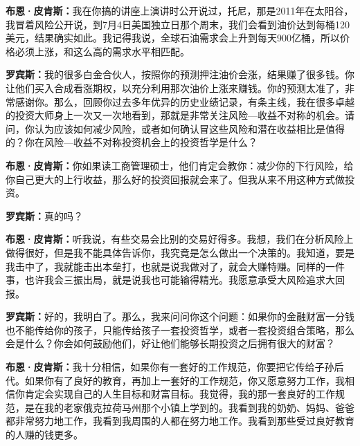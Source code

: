 \begin{BookQuote}
\textbf{布恩·皮肯斯：}我在你搞的讲座上演讲时公开说过，托尼，那是2011年在太阳谷，我冒着风险公开说，到7月4日美国独立日那个周末，我们会看到油价达到每桶120美元，结果确实如此。我记得我说，全球石油需求会上升到每天900亿桶，所以价格必须上涨，和这么高的需求水平相匹配。
\end{BookQuote}

\begin{BookQuote}
\textbf{罗宾斯：}我的很多白金合伙人，按照你的预测押注油价会涨，结果赚了很多钱。你让他们买入合成看涨期权，以充分利用那次油价上涨来赚钱。你的预测太准了，非常感谢你。那么，回顾你过去多年优异的历史业绩记录，有条主线，我在很多卓越的投资大师身上一次又一次地看到，那就是非常关注风险—收益不对称的机会。请问，你认为应该如何减少风险，或者如何确认冒这些风险和潜在收益相比是值得的？你在风险—收益不对称投资机会上的投资哲学是什么？
\end{BookQuote}

\begin{BookQuote}
\textbf{布恩·皮肯斯：}你如果读工商管理硕士，他们肯定会教你：减少你的下行风险，给你自己更大的上行收益，那么好的投资回报就会来了。但我从来不用这种方式做投资。
\end{BookQuote}

\begin{BookQuote}
\textbf{罗宾斯：}真的吗？
\end{BookQuote}

\begin{BookQuote}
\textbf{布恩·皮肯斯：}听我说，有些交易会比别的交易好得多。我想，我们在分析风险上做得很好，但是我不能具体告诉你，我究竟是怎么做出一个决策的。我知道，要是我击中了，我就能击出本垒打，也就是说我做对了，就会大赚特赚。同样的一件事，也许我会三振出局，就是说我也可能输得精光。我愿意承受大风险追求大回报。
\end{BookQuote}

\begin{BookQuote}
\textbf{罗宾斯：}好的，我明白了。那么，我来问问你这个问题：如果你的金融财富一分钱也不能传给你的孩子，只能传给孩子一套投资哲学，或者一套投资组合策略，那么会是什么？你会如何鼓励他们，好让他们能够长期投资之后拥有很大的财富？
\end{BookQuote}

\begin{BookQuote}
\textbf{布恩·皮肯斯：}我十分相信，如果你有一套好的工作规范，你要把它传给子孙后代。如果你有了良好的教育，再加上一套好的工作规范，你又愿意努力工作，我相信你肯定会实现自己的人生目标和财富目标。我觉得，我的那一套良好的工作规范，是在我的老家俄克拉荷马州那个小镇上学到的。我看到我的奶奶、妈妈、爸爸都非常努力地工作，我看到我周围的人都在努力地工作。我看到那些受过良好教育的人赚的钱更多。
\end{BookQuote}

